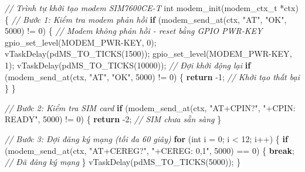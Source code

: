 \documentclass[a4paper]{extarticle}
\newenvironment{Shaded}{}{}
\newcommand{\CommentTok}[1]{\textcolor[rgb]{0.38,0.63,0.69}{\textit{#1}}}
\newcommand{\ControlFlowTok}[1]{\textcolor[rgb]{0.00,0.44,0.13}{\textbf{#1}}}
\newcommand{\DataTypeTok}[1]{\textcolor[rgb]{0.56,0.13,0.00}{#1}}
\newcommand{\DecValTok}[1]{\textcolor[rgb]{0.25,0.63,0.44}{#1}}
\newcommand{\NormalTok}[1]{#1}
\newcommand{\OperatorTok}[1]{\textcolor[rgb]{0.40,0.40,0.40}{#1}}
\newcommand{\StringTok}[1]{\textcolor[rgb]{0.25,0.44,0.63}{#1}}
\begin{document}
\begin{Shaded}
\begin{Highlighting}[]
\CommentTok{// Trình tự khởi tạo modem SIM7600CE{-}T}
\DataTypeTok{int}\NormalTok{ modem\_init}\OperatorTok{(}\NormalTok{modem\_ctx\_t }\OperatorTok{*}\NormalTok{ctx}\OperatorTok{)}
\OperatorTok{\{}
    \CommentTok{// Bước 1: Kiểm tra modem phản hồi}
    \ControlFlowTok{if} \OperatorTok{(}\NormalTok{modem\_send\_at}\OperatorTok{(}\NormalTok{ctx}\OperatorTok{,} \StringTok{"AT"}\OperatorTok{,} \StringTok{"OK"}\OperatorTok{,} \DecValTok{5000}\OperatorTok{)} \OperatorTok{!=} \DecValTok{0}\OperatorTok{)} \OperatorTok{\{}
        \CommentTok{// Modem không phản hồi {-} reset bằng GPIO PWR{-}KEY}
\NormalTok{        gpio\_set\_level}\OperatorTok{(}\NormalTok{MODEM\_PWR}\OperatorTok{{-}}\NormalTok{KEY}\OperatorTok{,} \DecValTok{0}\OperatorTok{);}
\NormalTok{        vTaskDelay}\OperatorTok{(}\NormalTok{pdMS\_TO\_TICKS}\OperatorTok{(}\DecValTok{1500}\OperatorTok{));}
\NormalTok{        gpio\_set\_level}\OperatorTok{(}\NormalTok{MODEM\_PWR}\OperatorTok{{-}}\NormalTok{KEY}\OperatorTok{,} \DecValTok{1}\OperatorTok{);}
\NormalTok{        vTaskDelay}\OperatorTok{(}\NormalTok{pdMS\_TO\_TICKS}\OperatorTok{(}\DecValTok{10000}\OperatorTok{));}  \CommentTok{// Đợi khởi động lại}
        \ControlFlowTok{if} \OperatorTok{(}\NormalTok{modem\_send\_at}\OperatorTok{(}\NormalTok{ctx}\OperatorTok{,} \StringTok{"AT"}\OperatorTok{,} \StringTok{"OK"}\OperatorTok{,} \DecValTok{5000}\OperatorTok{)} \OperatorTok{!=} \DecValTok{0}\OperatorTok{)} \OperatorTok{\{}
            \ControlFlowTok{return} \OperatorTok{{-}}\DecValTok{1}\OperatorTok{;}  \CommentTok{// Khởi tạo thất bại}
        \OperatorTok{\}}
    \OperatorTok{\}}

    \CommentTok{// Bước 2: Kiểm tra SIM card}
    \ControlFlowTok{if} \OperatorTok{(}\NormalTok{modem\_send\_at}\OperatorTok{(}\NormalTok{ctx}\OperatorTok{,} \StringTok{"AT+CPIN?"}\OperatorTok{,} \StringTok{"+CPIN: READY"}\OperatorTok{,} \DecValTok{5000}\OperatorTok{)} \OperatorTok{!=} \DecValTok{0}\OperatorTok{)} \OperatorTok{\{}
        \ControlFlowTok{return} \OperatorTok{{-}}\DecValTok{2}\OperatorTok{;}  \CommentTok{// SIM chưa sẵn sàng}
    \OperatorTok{\}}

    \CommentTok{// Bước 3: Đợi đăng ký mạng (tối đa 60 giây)}
    \ControlFlowTok{for} \OperatorTok{(}\DataTypeTok{int}\NormalTok{ i }\OperatorTok{=} \DecValTok{0}\OperatorTok{;}\NormalTok{ i }\OperatorTok{\textless{}} \DecValTok{12}\OperatorTok{;}\NormalTok{ i}\OperatorTok{++)} \OperatorTok{\{}
        \ControlFlowTok{if} \OperatorTok{(}\NormalTok{modem\_send\_at}\OperatorTok{(}\NormalTok{ctx}\OperatorTok{,} \StringTok{"AT+CEREG?"}\OperatorTok{,} \StringTok{"+CEREG: 0,1"}\OperatorTok{,} \DecValTok{5000}\OperatorTok{)} \OperatorTok{==} \DecValTok{0}\OperatorTok{)} \OperatorTok{\{}
            \ControlFlowTok{break}\OperatorTok{;}  \CommentTok{// Đã đăng ký mạng}
        \OperatorTok{\}}
\NormalTok{        vTaskDelay}\OperatorTok{(}\NormalTok{pdMS\_TO\_TICKS}\OperatorTok{(}\DecValTok{5000}\OperatorTok{));}
    \OperatorTok{\}}


\end{Highlighting}
\end{Shaded}
\end{document}

